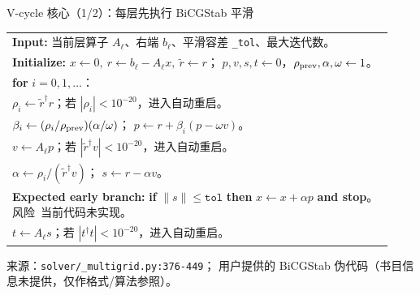 \documentclass[UTF8,aspectratio=169,11pt]{ctexbeamer}
\newcommand{\source}[1]{%
  \vspace{0.06em}\par{\raggedright\scriptsize\color{muted}来源：#1\par}}
\newcommand{\pathref}[1]{\nolinkurl{#1}}
\newcommand{\risk}{\textcolor{warn}{风险}}
\begin{document}
\begin{frame}[t]{V-cycle 核心（1/2）：每层先执行 BiCGStab 平滑}
  \begin{center}
    \small
    \begin{tabular}{@{}p{0.93\linewidth}@{}}
      \toprule
      \textbf{Input:}\quad
      当前层算子 $A_\ell$、右端 $b_\ell$、平滑容差 \texttt{\_tol}、最大迭代数。
      \\
      \textbf{Initialize:}\quad
      $x\gets0,\ r\gets b_\ell-A_\ell x,\ \tilde r\gets r$；
      $p,v,s,t\gets0$，$\rho_{\rm prev},\alpha,\omega\gets1$。
      \\
      \textbf{for } $i=0,1,\ldots$：
      \\
      \quad $\rho_i\gets\tilde r^\dagger r$；若 $|\rho_i|<10^{-20}$，进入自动重启。
      \\
      \quad $\beta_i\gets(\rho_i/\rho_{\rm prev})(\alpha/\omega)$；
      $p\gets r+\beta_i(p-\omega v)$。
      \\
      \quad $v\gets A_\ell p$；若 $|\tilde r^\dagger v|<10^{-20}$，进入自动重启。
      \\
      \quad $\alpha\gets\rho_i/(\tilde r^\dagger v)$；
      $s\gets r-\alpha v$。
      \\
      \quad \textbf{Expected early branch:}\quad
      \textbf{if } $\|s\|\le\texttt{tol}$ \textbf{ then } $x\gets x+\alpha p$
      \textbf{ and stop}。
      \quad \risk{\ 当前代码未实现。}
      \\
      \quad $t\gets A_\ell s$；若 $|t^\dagger t|<10^{-20}$，进入自动重启。
      \\
      \bottomrule
    \end{tabular}
  \end{center}
  \source{\pathref{solver/_multigrid.py:376-449}；
  用户提供的 BiCGStab 伪代码（书目信息未提供，仅作格式/算法参照）。}
\end{frame}
\end{document}
